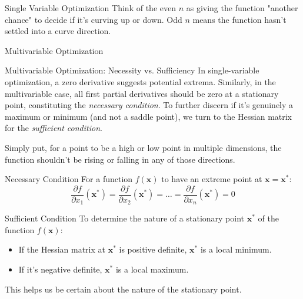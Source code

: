 \documentclass[
    NAME={Dr. Helga Ingimundardóttir},
    EMAIL={helgaingim@hi.is},
    FACULTY={Industrial Engineering},
    TITLE={Local and Global Optimization},
    SUBTITLE={Understanding Optima in Complex Landscapes},
    SEMINAR={VÉL113F},
    DATE={Design and Optimization},
    WIDE=true
]{../HI-latex/hi-beamer}
\begin{document}
\begin{frame}{Single Variable Optimization}
        Think of the even \(n\) as giving the function "another chance" to decide if it's curving up or down. Odd \(n\) means the function hasn't settled into a curve direction.
    \end{frame}

    \begin{frame}{Multivariable Optimization}

        \begin{block}{Multivariable Optimization: Necessity vs. Sufficiency}
            In single-variable optimization, a zero derivative suggests potential extrema. Similarly, in the
            multivariable case, all first partial derivatives should be zero at a stationary point, constituting the
            \emph{necessary condition}. To further discern if it's genuinely a maximum or minimum
            (and not a saddle point), we turn to the Hessian matrix for the \emph{sufficient condition}.
        \end{block}
        Simply put, for a point to be a high or low point in multiple dimensions, the function shouldn't be rising or falling in any of those directions.

        \framebreak
        \begin{alert}{Necessary Condition}
            For a function \(f(\mathbf{x})\) to have an extreme point at \(\mathbf{x} = \mathbf{x^*}\):
            \[
                \frac{\partial f}{\partial x_1}(\mathbf{x^*}) = \frac{\partial f}{\partial x_2}(\mathbf{x^*}) = \dots = \frac{\partial f}{\partial x_n}(\mathbf{x^*}) = 0
            \]
        \end{alert}

        \begin{alert}{Sufficient Condition}
            To determine the nature of a stationary point \(\mathbf{x^*}\) of the function \(f(\mathbf{x})\):
            \begin{itemize}
                \item If the Hessian matrix at \(\mathbf{x^*}\) is positive definite, \(\mathbf{x^*}\) is a local minimum.
                \item If it's negative definite, \(\mathbf{x^*}\) is a local maximum.
            \end{itemize}
            This helps us be certain about the nature of the stationary point.
        \end{alert}

        \framebreak


\end{frame}
\end{document}
